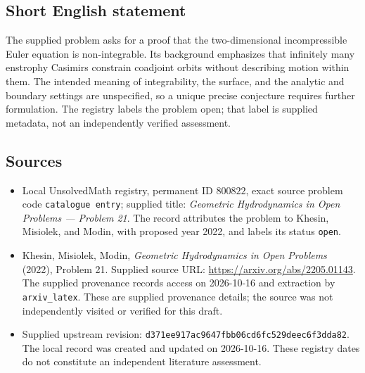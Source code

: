 \documentclass[11pt]{article}
\begin{document}
\subsection{Short English statement}
The supplied problem asks for a proof that the two-dimensional incompressible Euler equation is non-integrable. Its background emphasizes that infinitely many enstrophy Casimirs constrain coadjoint orbits without describing motion within them. The intended meaning of integrability, the surface, and the analytic and boundary settings are unspecified, so a unique precise conjecture requires further formulation. The registry labels the problem open; that label is supplied metadata, not an independently verified assessment.
\subsection{Sources}
\begin{itemize}
\item Local UnsolvedMath registry, permanent ID \(800822\), exact source problem code \texttt{catalogue entry}; supplied title: \emph{Geometric Hydrodynamics in Open Problems --- Problem 21}. The record attributes the problem to Khesin, Misiolek, and Modin, with proposed year 2022, and labels its status \texttt{open}.
\item Khesin, Misiolek, Modin, \emph{Geometric Hydrodynamics in Open Problems} (2022), Problem 21. Supplied source URL: \url{https://arxiv.org/abs/2205.01143}. The supplied provenance records access on 2026-10-16 and extraction by \texttt{arxiv\_latex}. These are supplied provenance details; the source was not independently visited or verified for this draft.
\item Supplied upstream revision: \texttt{d371ee917ac9647fbb06cd6fc529deec6f3dda82}. The local record was created and updated on 2026-10-16. These registry dates do not constitute an independent literature assessment.
\end{itemize}
\end{document}
